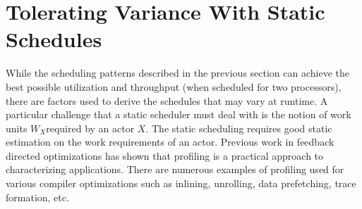 \section{Tolerating Variance With Static Schedules}

While the scheduling patterns described in the previous section can
achieve the best possible utilization and throughput (when scheduled
for two processors), there are factors used to derive the schedules
that may vary at runtime. A particular challenge that a static
scheduler must deal with is the notion of work units $W_X$required by
an actor $X$. The static scheduling requires good static estimation on
the work requirements of an actor. Previous work in feedback directed
optimizations has shown that profiling is a practical approach to
characterizing applications. There are numerous examples of profiling
used for various compiler optimizations such as inlining, unrolling,
data prefetching, trace formation, etc.



